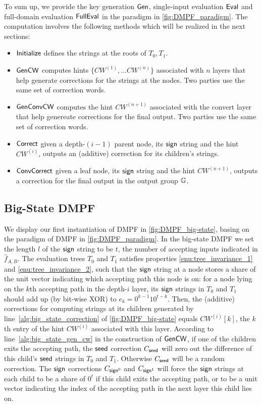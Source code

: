 To sum up, we provide the key generation ${\sf Gen}$, single-input evaluation ${\sf Eval}$ and full-domain evaluation ${\sf FullEval}$ in the paradigm in \cref{fig:DMPF_paradigm}. The computation involves the following methods which will be realized in the next sections: 
\begin{itemize}
  \item $\sf Initialize$ defines the strings at the roots of $T_0,T_1$.
  \item $\sf GenCW$ computes hints $\{CW^{(1)},\dots CW^{(n)}\}$ associated with $n$ layers that help generate corrections for the strings at the nodes. Two parties use the same set of correction words. 
  \item $\sf GenConvCW$ computes the hint $CW^{(n+1)}$ associated with the convert layer that help genereate corrections for the final output. Two parties use the same set of correction words. 
  \item $\sf Correct$ given a depth-$(i-1)$ parent node, its ${\sf sign}$ string and the hint $CW^{(i)}$, outputs an (additive) correction for its children's strings. 
  \item $\sf ConvCorrect$ given a leaf node, its ${\sf sign}$ string and the hint $CW^{(n+1)}$, outputs a correction for the final output in the output group $\mathbb{G}$. 
\end{itemize}

\subsection{Big-State DMPF}\label{sec:big_state_DMPF}
We display our first instantiation of DMPF in \cref{fig:DMPF_big-state}, basing on the paradigm of DMPF in \cref{fig:DMPF_paradigm}. In the big-state DMPF we set the length $l$ of the ${\sf sign}$ string to be $t$, the number of accepting inputs indicated in $\hat{f}_{A,B}$. The evaluation trees $T_0$ and $T_1$ satisfies properties \ref{enu:tree_invariance_1} and \ref{enu:tree_invariance_2}, such that the ${\sf sign}$ string at a node stores a share of the unit vector indicating which accepting path this node is on: for a node lying on the $k$th accepting path in the depth-$i$ layer, its ${\sf sign}$ strings in $T_0$ and $T_1$ should add up (by bit-wise XOR) to $e_k = 0^{k-1}10^{t-k}$. Then, the (additive) corrections for computing strings at its children generated by line~\ref{alg:big_state_correction} of \cref{fig:DMPF_big-state} equals $CW^{(i)}[k]$, the $k$th entry of the hint $CW^{(i)}$ associated with this layer. According to line~\ref{alg:big_state_gen_cw} in the construction of $\sf GenCW$, if one of the children exits the accepting path, the ${\sf seed}$ correction $C_{\sf seed}$ will zero out the difference of this child's ${\sf seed}$ strings in $T_0$ and $T_1$. Otherwise $C_{\sf seed}$ will be a random correction. The ${\sf sign}$ corrections $C_{{\sf sign}^0}$ and $C_{{\sf sign}^1}$ will force the ${\sf sign}$ strings at each child to be a share of $0^t$ if this child exits the accepting path, or to be a unit vector indicating the index of the accepting path in the next layer this child lies on. 


